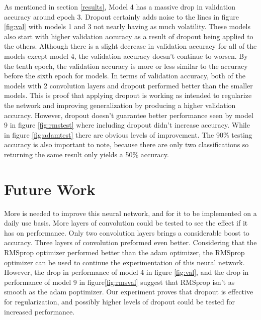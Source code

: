 \documentclass[twocolumn,letterpaper,10pt]{article}
\begin{document}
As mentioned in section \ref{results}, Model 4 has a massive drop in validation accuracy around epoch 3. Dropout certainly adds noise to the lines in figure \ref{fig:val} with models 1 and 3 not nearly having as much volatility. These models also start with higher validation accuracy as a result of dropout being applied to the others. Although there is a slight decrease in validation accuracy for all of the models except model 4, the validation accuracy doesn't continue to worsen. By the tenth epoch, the validation accuracy is more or less similar to the accuracy before the sixth epoch for models. In terms of validation accuracy, both of the models with 2 convolution layers and dropout performed better than the smaller models. This is proof that applying dropout is working as intended to regularize the network and improving generalization by producing a higher validation accuracy. However, dropout doesn't guarantee better performance seen by model 9 in figure \ref{fig:rmstest} where including dropout didn't increase accuracy. While in figure \ref{fig:adamtest} there are obvious levels of improvement. The 90\% testing accuracy is also important to note, because there are only two classifications so returning the same result only yields a 50\% accuracy. 

\section{Future Work}
\label{future}
More is needed to improve this neural network, and for it to be implemented on a daily use basis. More layers of convolution could be tested to see the effect if it has on performance. Only two convolution layers brings a considerable boost to accuracy. Three layers of convolution preformed even better. Considering that the RMSprop optimizer performed better than the adam optimizer, the RMSprop optimizer can be used to continue the experimentation of this neural network. However, the drop in performance of model 4 in figure \ref{fig:val}, and the drop in performance of model 9 in figure\ref{fig:rmsval} suggest that RMSprop isn't as smooth as the adam poptimizer. Our experiment proves that dropout is effective for regularization, and possibly higher levels of dropout could be tested for increased performance. 
\end{document}
